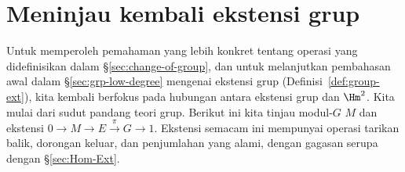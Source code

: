 
\section{Meninjau kembali ekstensi grup}\label{sec:group-ext-revisited}
\hypertarget{o014.aljabr2.chapter6.group-extensions-revisited}{ }

Untuk memperoleh pemahaman yang lebih konkret tentang operasi yang
didefinisikan dalam \S\ref{sec:change-of-group}, dan untuk melanjutkan
pembahasan awal dalam \S\ref{sec:grp-low-degree} mengenai ekstensi grup
(Definisi~\ref{def:group-ext}), kita kembali berfokus pada hubungan antara
ekstensi grup dan $\Hm^2$. Kita mulai dari sudut pandang teori grup. Berikut
ini kita tinjau modul-$G$ $M$ dan ekstensi
$0\to M\to E\xrightarrow{\pi}G\to1$. Ekstensi semacam ini mempunyai operasi
tarikan balik, dorongan keluar, dan penjumlahan yang alami, dengan gagasan
serupa dengan \S\ref{sec:Hom-Ext}.


